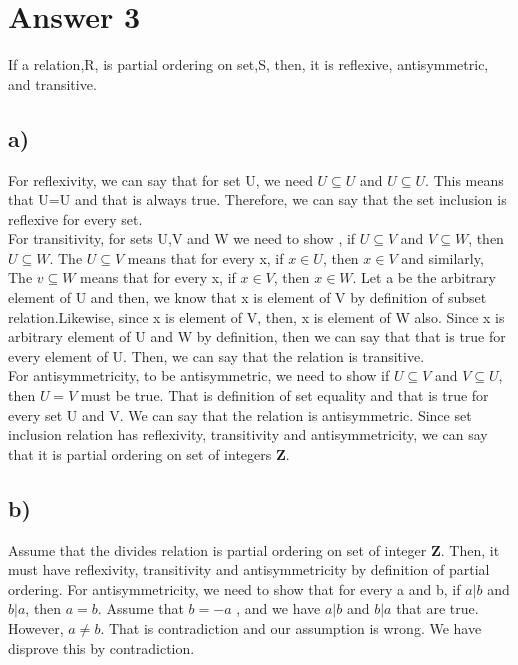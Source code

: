 \documentclass[12pt]{article}
\begin{document}
\section*{Answer 3}
If a relation,R, is partial ordering on set,S, then, it is reflexive, 
antisymmetric, and transitive.
\subsection*{a)}
For reflexivity, we can say that for set U, we need $U \subseteq U$ and $U \subseteq U$. This means that U=U and that is always true. Therefore, we can say that the set inclusion is reflexive for every set. \\
For transitivity, for sets U,V and W we need to show , if $U \subseteq V$ and $V \subseteq W$, then $U \subseteq W$. The $U \subseteq V$ means that for every x, if $x\in U$, then $x \in V$ and similarly, The $v \subseteq W$ means that for every x, if $x\in V$, then $x \in W$. Let a be the arbitrary element of U and then, we know that x is element of V by definition of subset relation.Likewise, since x is element of V, then, x is element of W also. Since x is arbitrary element of U and W by definition, then we can say that that is true for every element of U. Then, we can say that the relation is transitive. \\
For antisymmetricity, to be antisymmetric, we need to show if  $U \subseteq V$ and $V \subseteq U$, then $U=V$ must be true. That is definition of  set equality and that is true for every set U and V. We can say that the relation is antisymmetric.
Since set inclusion relation has reflexivity, transitivity and antisymmetricity, we can say that it is partial ordering on set of integers \textbf{Z}.
\subsection*{b)}
Assume that the divides relation is partial ordering on set of integer \textbf{Z}. Then,  it must have reflexivity, transitivity and antisymmetricity by definition of partial ordering. For antisymmetricity, we need to show that for every a and b, if $a|b$ and $b|a$, then $a=b$. Assume that $b = - a$ , and we have $a|b$ and $b|a$ that are true. However, $a\neq b$. That is contradiction and our assumption is wrong. We have disprove this by contradiction. \\
\end{document}
